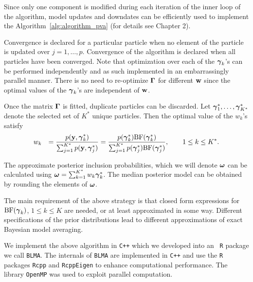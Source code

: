     \noindent 
    Since only one component is modified during each iteration of the inner
    loop of the algorithm, model updates and downdates can be efficiently used
    to implement the Algorithm~\ref{alg:algorithm_pva} (for details see
    Chapter 2).

 Convergence is declared for a particular particle when no element of
the particle is updated over $j=1,\ldots,p$. Convergence of the algorithm is
declared when all particles have been converged. Note that optimization over
each of the ${\boldsymbol \gamma}_k$'s can be performed independently and as such
implemented in an embarrassingly parallel manner.  There is no need to
re-optimize ${\boldsymbol \Gamma}$ for different ${\bf w}$ since  the optimal values of the
${\boldsymbol \gamma}_k$'s are independent of ${\bf w}$.

Once the matrix ${\boldsymbol \Gamma}$ is fitted, duplicate particles can be discarded.  Let
${{\boldsymbol \gamma}}_1^*,\ldots,{{\boldsymbol \gamma}}_{K^*}^*$ denote the selected set of $K^*$
unique particles. Then the optimal value of the $w_k$'s satisfy
\begin{equation}
\label{eq:updateW}
\begin{array}{rl}
\displaystyle w_k 
& \displaystyle = \frac{\displaystyle p({\bf y},{\boldsymbol \gamma}_k^*)}{\sum_{j=1}^{K^*} p({\bf y},{\boldsymbol \gamma}_j^*)}
= \frac{p({\boldsymbol \gamma}_k^*)\mbox{BF}({\boldsymbol \gamma}_k^*)
}{\sum_{j=1}^{K^*}
	p({\boldsymbol \gamma}_j^*)\mbox{BF}({\boldsymbol \gamma}_j^*)
}, \qquad 1\le k\le K^*.
\end{array}
\end{equation}

\noindent The approximate posterior inclusion probabilities, which we will
denote ${\boldsymbol \omega}$ can be calculated using ${\boldsymbol \omega} = \sum_{k=1}^{K^*} w_k
{\boldsymbol \gamma}_k^*$.  The median posterior model can be obtained by rounding the
elements of ${\boldsymbol \omega}$.

The main requirement of the above strategy is that closed form expressions for
$\mbox{BF}({\boldsymbol \gamma}_k)$, $1\le k\le K$ are needed, or at least approximated in
some way.  Different specifications of the prior distributions lead to
different approximations of exact Bayesian model averaging.

We implement the above algorithm in {\tt C++} which we developed into an {\tt
R} package we call  {\tt BLMA}.  The internals of {\tt BLMA} are implemented in
{\tt C++} and use the {\tt R} packages \texttt{Rcpp} and \texttt{RcppEigen} to
enhance computational performance. The library {\tt OpenMP} was used to exploit
parallel computation.

